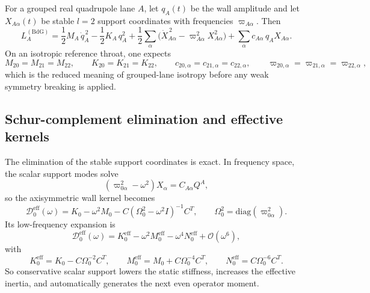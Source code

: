 \documentclass[11pt]{article}
\theoremstyle{definition}
\newcommand{\eff}{\mathrm{eff}}
\newcommand{\diag}{\mathrm{diag}}
\newcommand{\cO}{\mathcal O}
\newcommand{\cD}{\mathcal D}
\begin{document}
For a grouped real quadrupole lane $A$, let $q_A(t)$ be the wall amplitude and let $X_{A\alpha}(t)$ be stable $l=2$ support coordinates with frequencies $\varpi_{A\alpha}$. Then
\begin{equation}
L_A^{(\mathrm{BdG})}
=
\frac12 M_A\,\dot q_A^{\,2}
-
\frac12 K_A\,q_A^2
+
\frac12\sum_\alpha \bigl(\dot X_{A\alpha}^{\,2}-\varpi_{A\alpha}^2 X_{A\alpha}^2\bigr)
+
\sum_\alpha c_{A\alpha}\,q_A X_{A\alpha}.
\label{eq:reduced-p2-bdg-lagrangian}
\end{equation}
On an isotropic reference throat, one expects
\[
M_{20}=M_{21}=M_{22},
\qquad
K_{20}=K_{21}=K_{22},
\qquad
c_{20,\alpha}=c_{21,\alpha}=c_{22,\alpha},
\qquad
\varpi_{20,\alpha}=\varpi_{21,\alpha}=\varpi_{22,\alpha},
\]
which is the reduced meaning of grouped-lane isotropy before any weak symmetry breaking is applied.

\subsection{Schur-complement elimination and effective kernels}

The elimination of the stable support coordinates is exact. In frequency space, the scalar support modes solve
\[
(\varpi_{0\alpha}^2-\omega^2)X_\alpha=C_{A\alpha}Q^A,
\]
so the axisymmetric wall kernel becomes
\begin{equation}
\cD_0^{\eff}(\omega)
=
K_0-\omega^2 M_0-C(\Omega_0^2-\omega^2 I)^{-1}C^T,
\qquad
\Omega_0^2=\diag(\varpi_{0\alpha}^2).
\label{eq:reduced-scalar-kernel}
\end{equation}
Its low-frequency expansion is
\begin{equation}
\cD_0^{\eff}(\omega)
=
K_0^{\eff}-\omega^2 M_0^{\eff}-\omega^4 N_0^{\eff}+\cO(\omega^6),
\label{eq:reduced-scalar-kernel-expansion}
\end{equation}
with
\begin{equation}
K_0^{\eff}=K_0-C\Omega_0^{-2}C^T,
\qquad
M_0^{\eff}=M_0+C\Omega_0^{-4}C^T,
\qquad
N_0^{\eff}=C\Omega_0^{-6}C^T.
\label{eq:reduced-scalar-renormalized-moments}
\end{equation}
So conservative scalar support lowers the static stiffness, increases the effective inertia, and automatically generates the next even operator moment.
\end{document}

